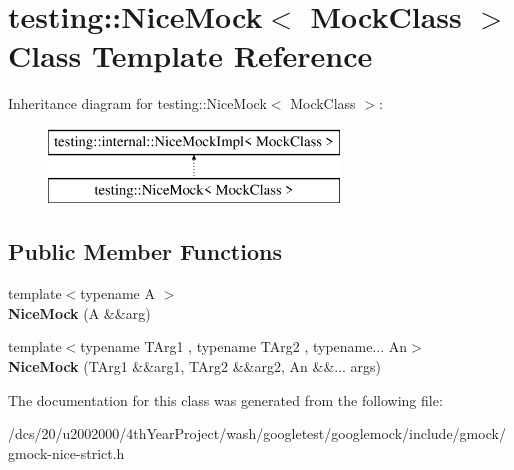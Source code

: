 \hypertarget{classtesting_1_1NiceMock}{}\section{testing\+:\+:Nice\+Mock$<$ Mock\+Class $>$ Class Template Reference}
\label{classtesting_1_1NiceMock}
Inheritance diagram for testing\+:\+:Nice\+Mock$<$ Mock\+Class $>$\+:\begin{figure}[H]
\begin{center}
\leavevmode
\includegraphics[height=2.000000cm]{classtesting_1_1NiceMock}
\end{center}
\end{figure}
\subsection*{Public Member Functions}
\begin{DoxyCompactItemize}
\item 
\mbox{\label{classtesting_1_1NiceMock_a63f2d3b2af1c725036df39367c90fe6d}} 
{\footnotesize template$<$typename A $>$ }\\{\bfseries Nice\+Mock} (A \&\&arg)
\item 
\mbox{\label{classtesting_1_1NiceMock_affe2ff52c46e716b579bf723c75cb39d}} 
{\footnotesize template$<$typename T\+Arg1 , typename T\+Arg2 , typename... An$>$ }\\{\bfseries Nice\+Mock} (T\+Arg1 \&\&arg1, T\+Arg2 \&\&arg2, An \&\&... args)
\end{DoxyCompactItemize}


The documentation for this class was generated from the following file\+:\begin{DoxyCompactItemize}
\item 
/dcs/20/u2002000/4th\+Year\+Project/wash/googletest/googlemock/include/gmock/gmock-\/nice-\/strict.\+h\end{DoxyCompactItemize}
